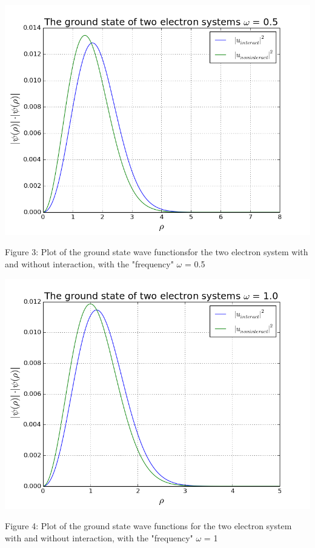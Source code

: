 \documentclass[norsk,a4paper,12pt]{article}
\begin{document}
\includegraphics[scale=0.55]{wavefunc_two_omega=0_5}\par
\vspace{1mm}
Figure 3: Plot of the ground state wave functionsfor the two electron system with and without interaction, with the "frequency" $\omega$ = 0.5
\par
\vspace{7mm}

\includegraphics[scale=0.65]{wavefunc_two_omega=1}\par
\vspace{1mm}
Figure 4: Plot of the ground state wave functions for the two electron system with and without interaction, with the "frequency" $\omega$ = 1
\par
\vspace{7mm}
\end{document}
